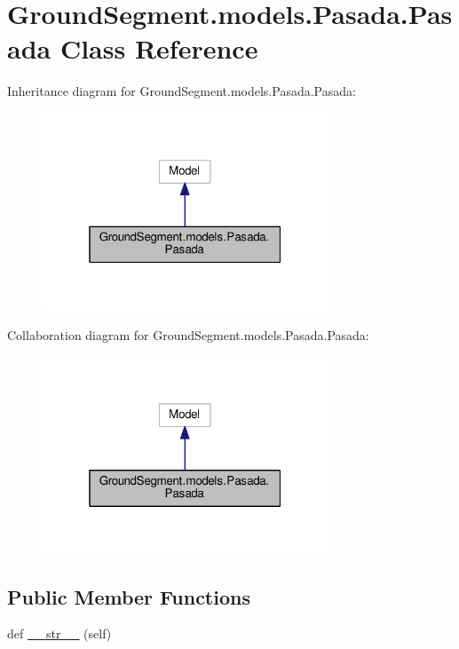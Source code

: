 \hypertarget{class_ground_segment_1_1models_1_1_pasada_1_1_pasada}{}\section{Ground\+Segment.\+models.\+Pasada.\+Pasada Class Reference}
\label{class_ground_segment_1_1models_1_1_pasada_1_1_pasada}


Inheritance diagram for Ground\+Segment.\+models.\+Pasada.\+Pasada\+:\nopagebreak
\begin{figure}[H]
\begin{center}
\leavevmode
\includegraphics[width=241pt]{class_ground_segment_1_1models_1_1_pasada_1_1_pasada__inherit__graph}
\end{center}
\end{figure}


Collaboration diagram for Ground\+Segment.\+models.\+Pasada.\+Pasada\+:\nopagebreak
\begin{figure}[H]
\begin{center}
\leavevmode
\includegraphics[width=241pt]{class_ground_segment_1_1models_1_1_pasada_1_1_pasada__coll__graph}
\end{center}
\end{figure}
\subsection*{Public Member Functions}
\begin{DoxyCompactItemize}
\item 
def \hyperlink{class_ground_segment_1_1models_1_1_pasada_1_1_pasada_a5c21dff9dda2ed2fa07752dfb0c1938b}{\+\_\+\+\_\+str\+\_\+\+\_\+} (self)
\end{DoxyCompactItemize}
